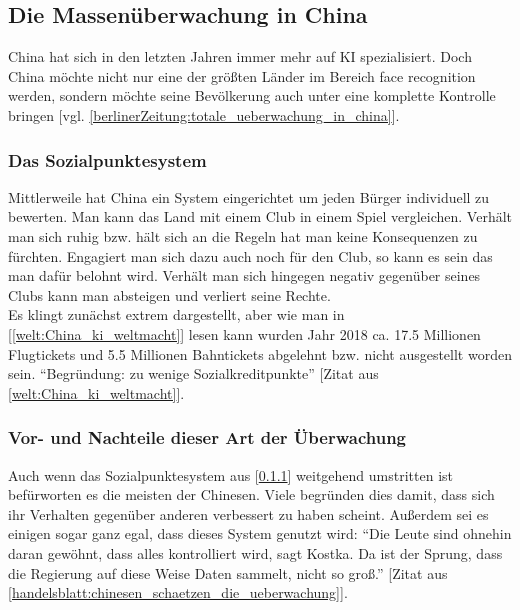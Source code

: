     \subsection{Die Massenüberwachung in China}
    \label{China:Massenueberwachung}
        China hat sich in den letzten Jahren immer mehr auf KI spezialisiert. Doch China möchte nicht nur eine der größten Länder im Bereich face recognition werden, sondern möchte seine Bevölkerung auch unter eine komplette Kontrolle bringen [vgl. \ref{berlinerZeitung:totale_ueberwachung_in_china}].

        \subsubsection{Das Sozialpunktesystem}
        \label{china:das_sozialpunktesystem}
            Mittlerweile hat China ein System eingerichtet um jeden Bürger individuell zu bewerten. Man kann das Land mit einem Club in einem Spiel vergleichen. Verhält man sich ruhig bzw. hält sich an die Regeln hat man keine Konsequenzen zu fürchten. Engagiert man sich dazu auch noch für den Club, so kann es sein das man dafür belohnt wird. Verhält man sich hingegen negativ gegenüber seines Clubs kann man absteigen und verliert seine Rechte.\\
            Es klingt zunächst extrem dargestellt, aber wie man in [\ref{welt:China_ki_weltmacht}] lesen kann wurden Jahr 2018 ca. 17.5 Millionen Flugtickets und 5.5 Millionen Bahntickets abgelehnt bzw. nicht ausgestellt worden sein. \enquote{Begründung: zu wenige Sozialkreditpunkte} [Zitat aus \ref{welt:China_ki_weltmacht}].

        \subsubsection{Vor- und Nachteile dieser Art der Überwachung}
            Auch wenn das Sozialpunktesystem aus [\ref{china:das_sozialpunktesystem}] weitgehend umstritten ist befürworten es die meisten der Chinesen. Viele begründen dies damit, dass sich ihr Verhalten gegenüber anderen verbessert zu haben scheint. Außerdem sei es einigen sogar ganz egal, dass dieses System genutzt wird: \enquote{Die Leute sind ohnehin daran gewöhnt, dass alles kontrolliert wird, sagt Kostka. Da ist der Sprung, dass die Regierung auf diese Weise Daten sammelt, nicht so groß.} [Zitat aus \ref{handelsblatt:chinesen_schaetzen_die_ueberwachung}].

